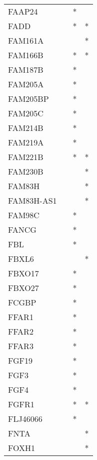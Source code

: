 \begin{longtable}{lccc}
FAAP24       &           &   * &         \\
FADD         &           &   * &       * \\
FAM161A      &           &     &       * \\
FAM166B      &           &   * &       * \\
FAM187B      &           &   * &         \\
FAM205A      &           &   * &         \\
FAM205BP     &           &   * &         \\
FAM205C      &           &   * &         \\
FAM214B      &           &   * &         \\
FAM219A      &           &   * &         \\
FAM221B      &           &   * &       * \\
FAM230B      &           &     &       * \\
FAM83H       &           &     &       * \\
FAM83H-AS1   &           &     &       * \\
FAM98C       &           &   * &         \\
FANCG        &           &   * &         \\
FBL          &           &   * &         \\
FBXL6        &           &     &       * \\
FBXO17       &           &   * &         \\
FBXO27       &           &   * &         \\
FCGBP        &           &   * &         \\
FFAR1        &           &   * &         \\
FFAR2        &           &   * &         \\
FFAR3        &           &   * &         \\
FGF19        &           &   * &         \\
FGF3         &           &   * &         \\
FGF4         &           &   * &         \\
FGFR1        &           &   * &       * \\
FLJ46066     &           &   * &         \\
FNTA         &           &     &       * \\
FOXH1        &           &     &       * \\

\end{longtable}
